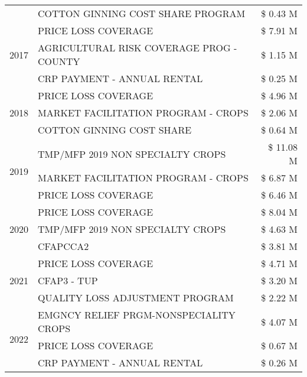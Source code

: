 \begin{tabular}{llr}
 & COTTON GINNING COST SHARE PROGRAM & \$ 0.43 M \\
\cline{1-3}
\multirow[t]{3}{*}{2017} & PRICE LOSS COVERAGE & \$ 7.91 M \\
 & AGRICULTURAL RISK COVERAGE PROG - COUNTY & \$ 1.15 M \\
 & CRP PAYMENT - ANNUAL RENTAL & \$ 0.25 M \\
\cline{1-3}
\multirow[t]{3}{*}{2018} & PRICE LOSS COVERAGE & \$ 4.96 M \\
 & MARKET FACILITATION PROGRAM - CROPS & \$ 2.06 M \\
 & COTTON GINNING COST SHARE & \$ 0.64 M \\
\cline{1-3}
\multirow[t]{3}{*}{2019} & TMP/MFP 2019 NON SPECIALTY CROPS & \$ 11.08 M \\
 & MARKET FACILITATION PROGRAM - CROPS & \$ 6.87 M \\
 & PRICE LOSS COVERAGE & \$ 6.46 M \\
\cline{1-3}
\multirow[t]{3}{*}{2020} & PRICE LOSS COVERAGE & \$ 8.04 M \\
 & TMP/MFP 2019 NON SPECIALTY CROPS & \$ 4.63 M \\
 & CFAPCCA2 & \$ 3.81 M \\
\cline{1-3}
\multirow[t]{3}{*}{2021} & PRICE LOSS COVERAGE & \$ 4.71 M \\
 & CFAP3 - TUP & \$ 3.20 M \\
 & QUALITY LOSS ADJUSTMENT PROGRAM & \$ 2.22 M \\
\cline{1-3}
\multirow[t]{3}{*}{2022} & EMGNCY RELIEF PRGM-NONSPECIALITY CROPS & \$ 4.07 M \\
 & PRICE LOSS COVERAGE & \$ 0.67 M \\
 & CRP PAYMENT - ANNUAL RENTAL & \$ 0.26 M \\
\cline{1-3}
\bottomrule
\end{tabular}
